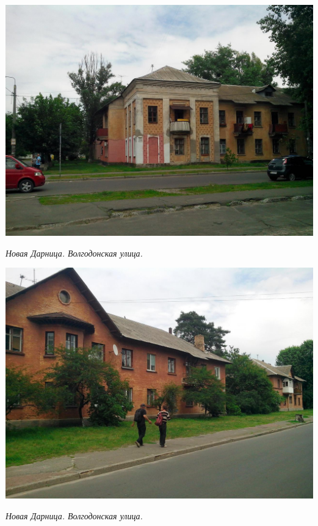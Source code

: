 \begin{center}
\includegraphics[width=\linewidth]{lpix/IMG_20160613_145115.jpg}

\textit{Новая Дарница. Волгодонская улица.}
\end{center}

\begin{center}
\includegraphics[width=\linewidth]{lpix/IMG_20160613_145313.jpg}

\textit{Новая Дарница. Волгодонская улица.}
\end{center}
\newpage


